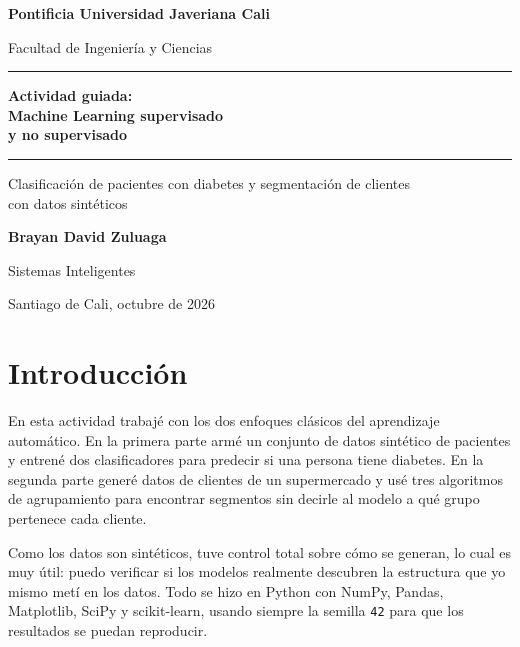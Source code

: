 \documentclass[11pt,letterpaper]{article}
\begin{document}
\begin{titlepage}
  \centering
  \vspace*{2cm}
  {\Large\bfseries Pontificia Universidad Javeriana Cali\par}
  \vspace{0.3cm}
  {\large Facultad de Ingeniería y Ciencias\par}
  \vspace{2.5cm}
  {\color{azuljaveriana}\rule{\linewidth}{1pt}\par}
  \vspace{0.4cm}
  {\huge\bfseries Actividad guiada:\\[0.2cm] Machine Learning supervisado\\ y no supervisado\par}
  \vspace{0.4cm}
  {\color{azuljaveriana}\rule{\linewidth}{1pt}\par}
  \vspace{1cm}
  {\large Clasificación de pacientes con diabetes y segmentación de clientes\\ con datos sintéticos\par}
  \vfill
  {\large\bfseries Brayan David Zuluaga\par}
  \vspace{0.3cm}
  {\large Sistemas Inteligentes\par}
  \vspace{1.5cm}
  {\large Santiago de Cali, octubre de 2026\par}
\end{titlepage}

\tableofcontents
\newpage

\section{Introducción}

En esta actividad trabajé con los dos enfoques clásicos del aprendizaje automático. En la primera parte
armé un conjunto de datos sintético de pacientes y entrené dos clasificadores para predecir si una persona
tiene diabetes. En la segunda parte generé datos de clientes de un supermercado y usé tres algoritmos de
agrupamiento para encontrar segmentos sin decirle al modelo a qué grupo pertenece cada cliente.

Como los datos son sintéticos, tuve control total sobre cómo se generan, lo cual es muy útil: puedo
verificar si los modelos realmente descubren la estructura que yo mismo metí en los datos. Todo se hizo en
Python con NumPy, Pandas, Matplotlib, SciPy y scikit-learn, usando siempre la semilla \texttt{42} para que los
resultados se puedan reproducir.
\end{document}
